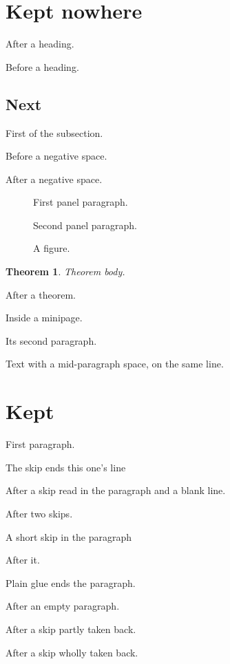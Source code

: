 \documentclass{article}
\newtheorem{theorem}{Theorem}
\begin{document}
\section{Kept nowhere}
\bigskip
After a heading.

Before a heading.

\bigskip
\subsection{Next}
First of the subsection.

Before a negative space.

\vspace{-3mm}
After a negative space.

\begin{figure}[h]
First panel paragraph.

\bigskip
Second panel paragraph.
\caption{A figure.}
\end{figure}
\begin{theorem}
Theorem body.
\end{theorem}
\bigskip
After a theorem.

\noindent\begin{minipage}{0.5\textwidth}
Inside a minipage.

\bigskip
Its second paragraph.
\end{minipage}

Text with a mid-paragraph \vspace{1cm} space, on the same line.

\section{Kept}
First paragraph.

The skip ends this one's line
\medskip

After a skip read in the paragraph and a blank line.

\bigskip\medskip
After two skips.

A short skip in the paragraph
\smallskip

After it.

Plain glue \vskip 1cm ends the paragraph.

\medskip\noindent

After an empty paragraph.

\bigskip\vspace{-6pt}
After a skip partly taken back.

\vskip 36pt\vskip -36pt
After a skip wholly taken back.
\end{document}
